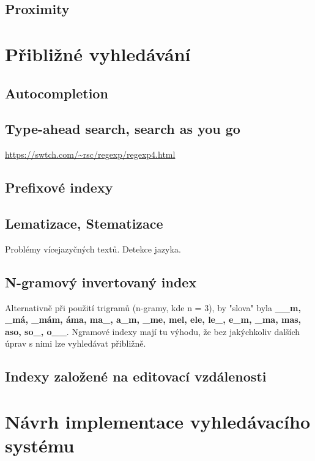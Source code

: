 \documentclass[11pt]{article}
\begin{document}
\subsection{Proximity}

\section{Přibližné vyhledávání}

\subsection{Autocompletion}

\subsection{Type-ahead search, search as you go}

\url{https://swtch.com/~rsc/regexp/regexp4.html}
\subsection{Prefixové indexy}

\subsection{Lematizace, Stematizace}
Problémy vícejazyčných textů. Detekce jazyka.

\subsection{N-gramový invertovaný index}
Alternativně při použití trigramů (n-gramy, kde n = 3), by "slova" byla
\textbf{\_\_m, \_má, \_mám, áma, ma\_, a\_m, \_me, mel, ele, le\_, e\_m, \_ma,
mas, aso, so\_, o\_\_}. Ngramové indexy mají tu výhodu, že bez jakýchkoliv
dalších úprav s nimi lze vyhledávat přibližně. 

\subsection{Indexy založené na editovací vzdálenosti}

\section{Návrh implementace vyhledávacího systému}
\end{document}
